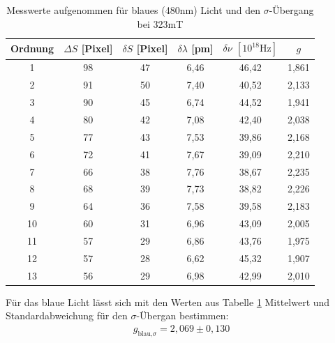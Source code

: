 \begin{table}[htbp]
    \begin{tabular}{|c|c|c|c|c|c|}
        Ordnung & $\Delta S$ [Pixel]    & $\delta S$ [Pixel]    &$\delta \lambda$ [pm]  & $\delta \nu$ $[10^{18}\text{Hz}]$ &   $g$\\\hline
        1&  98& 47& 6,46&   46,42&  1,861\\\hline
        2&  91& 50& 7,40&   40,52&  2,133\\\hline
        3&  90& 45& 6,74&   44,52&  1,941\\\hline
        4&  80& 42& 7,08&   42,40&  2,038\\\hline
        5&  77& 43& 7,53&   39,86&  2,168\\\hline
        6&  72& 41& 7,67&   39,09&  2,210\\\hline
        7&  66& 38& 7,76&   38,67&  2,235\\\hline
        8&  68& 39& 7,73&   38,82&  2,226\\\hline
        9&  64& 36& 7,58&   39,58&  2,183\\\hline
        10& 60& 31& 6,96&   43,09&  2,005\\\hline
        11& 57& 29& 6,86&   43,76&  1,975\\\hline
        12& 57& 28& 6,62&   45,32&  1,907\\\hline
        13& 56& 29& 6,98&   42,99&  2,010\\\hline
    \end{tabular}
    \caption{Messwerte aufgenommen für blaues (480nm) Licht und den $\sigma$-Übergang bei 323mT}
    \label{tab_blue_sigma}
\end{table}

Für das blaue Licht lässt sich mit den Werten aus Tabelle \ref{tab_blue_sigma} Mittelwert und Standardabweichung für den $\sigma$-Übergan bestimmen:
\begin{align*}
g_{\text{blau,}\sigma}=2,069\pm0,130
\end{align*}

